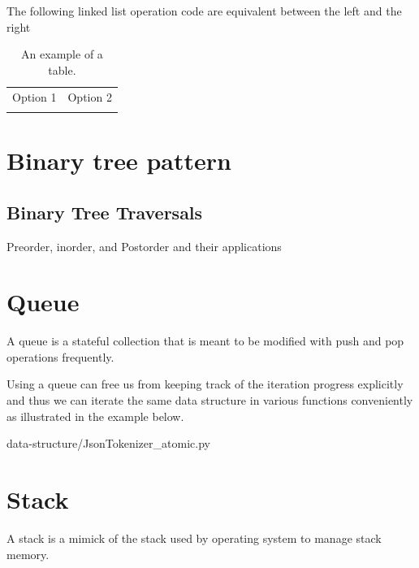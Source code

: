 \documentclass[oneside,11pt]{book}
\theoremstyle{definition}
\theoremstyle{remark}
\begin{document}
The following linked list operation code are equivalent between the left and the right
\begin{table}[b]
    \begin{center}
        \caption{An example of a table.}
        \begin{tabular}{p{7cm}|p{7cm}}
            Option 1 & Option 2  \\
            
            &
             \\
        \end{tabular}
    \end{center}
\end{table}
\clearpage{}
    \clearpage{}

\section{Binary tree pattern}\label{sec:binaryTreePattern}

\label{Evernote:Printing a Binary Tree in Level Order}

\label{Evernote:Largest BST Subtree}

\subsection{Binary Tree Traversals}

Preorder, inorder, and Postorder and their applications
\clearpage{}
    \clearpage{}\section{Queue}\label{sec:queue}

A queue is a stateful collection that is meant to be modified with push and pop operations
frequently.

Using a queue can free us from keeping track of the iteration progress explicitly and thus we can
iterate the same data structure in various functions conveniently as illustrated in the example
below.

{data-structure/JsonTokenizer_atomic.py}

\section{Stack}\label{sec:stack}
A stack is a mimick of the stack used by operating system to manage stack memory.
\end{document}
